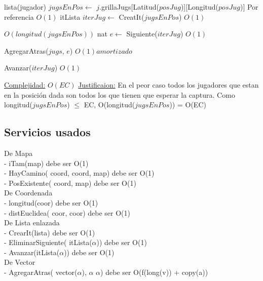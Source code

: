 \begin{Algoritmos}
\begin{algorithm}[H]
\begin{algorithmic}[1]
\State lista(jugador) $jugsEnPos \gets$ $j$.grillaJugs[Latitud($posJug$)][Longitud($posJug$)] \Comment Por referencia $O(1)$
\State itLista $iterJug \gets$ CreatIt($jugsEnPos$) \Comment $O(1)$

 \Comment $O(longitud(jugsEnPos))$
    \State nat $e \gets$ Siguiente($iterJug$) \Comment $O(1)$

        \State AgregarAtras($jugs$, $e$) \Comment $O(1) amortizado$
    \EndIf 

    \State Avanzar($iterJug$) \Comment $O(1)$


\EndWhile

\medskip
\Statex \underline{Complejidad:} $O(EC)$
\Statex \underline{Justificaion:} En el peor caso todos los jugadores que estan en la posici\'on dada son todos los que tienen que esperar la captura. Como longitud($jugsEnPos$) $\leq$ EC, O(longitud($jugsEnPos$)) = O(EC)

\end{algorithmic}
\end{algorithm}  
  
\end{Algoritmos}



\subsection{Servicios usados} 

De Mapa \\
 - iTam(map) debe ser O(1) \\
 - HayCamino( coord, coord, map) debe ser  O(1) \\
 - PosExistente( coord,  map)  debe ser O(1) \\

De Coordenada \\
 - longitud(coor) debe ser O(1) \\
 - distEuclidea( coor, coor)  debe ser O(1) \\
 

De Lista enlazada \\
 - CrearIt(lista) debe ser O(1) \\
 - EliminarSiguiente( itLista($\alpha$)) debe ser O(1) \\
 - Avanzar(itLista($\alpha$)) debe ser O(1) \\

De Vector \\
 - AgregarAtras( vector($\alpha$), $\alpha$ $\alpha$) debe ser O(f(long(v)) + copy(a))\\

